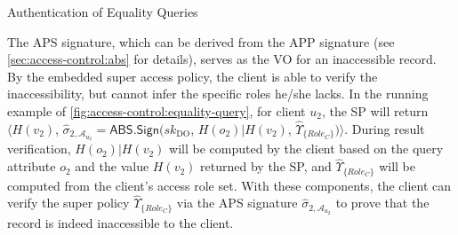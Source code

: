\begin{algorithm}[t]
  \caption{Authentication of Equality Queries}\label{alg:access-control:equality-query}
\end{algorithm}

The APS signature, which can be derived from the APP signature (see \cref{sec:access-control:abs} for details), serves as the VO for an inaccessible record. %
By the embedded super access policy, the client is able to verify the inaccessibility, but cannot infer the specific roles he/she lacks.
In the running example of \cref{fig:access-control:equality-query}, for client $u_2$, the SP will return $\langle H(v_2)$, $\hat{\sigma}_{2, \mathcal{A}_{u_2}} = \textsf{ABS.Sign}({sk}_\text{DO}$, $H(o_2) | H(v_2)$, $\hat{\Upsilon}_{\{{Role}_C \}})\rangle$. During result verification, $H(o_2) | H(v_2)$ will be computed by the client based on the query attribute $o_2$ and the value $H(v_2)$ returned by the SP, and $\hat{\Upsilon}_{\{{Role}_C \}}$ will be computed from the client's access role set. With these components, the client can verify the super policy $\hat{\Upsilon}_{\{{Role}_C \}}$ via the APS signature $\hat{\sigma}_{2, \mathcal{A}_{u_2}}$ to prove that the record is indeed inaccessible to the client. %

